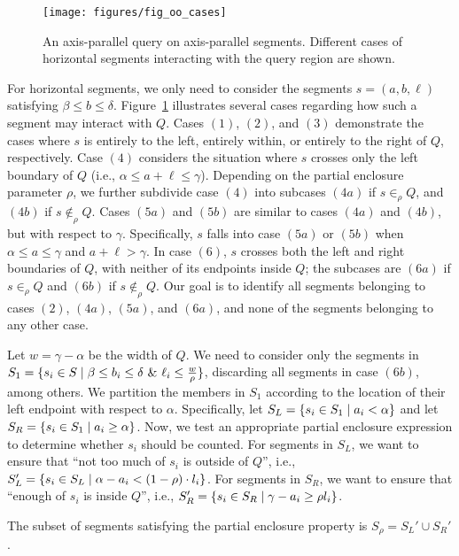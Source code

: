 \begin{figure}[t]
\centering
\texttt{[image: figures/fig\_oo\_cases]}
\caption{An axis-parallel query on axis-parallel segments. Different cases 
of horizontal segments interacting with the query region are shown.}
\label{:fig:rectangles:ap:cases}
\end{figure}

For horizontal segments, we only need to consider the segments  
$s=(a, b, \ell)$
satisfying $\beta \leq b \leq \delta$. 
Figure~\ref{:fig:rectangles:ap:cases} illustrates several cases 
regarding how such a segment may interact with $Q$. 
Cases $(1)$, $(2)$, and $(3)$ demonstrate the cases where $s$ is 
entirely to the left, entirely within, or entirely to the right of $Q$, 
respectively. Case $(4)$ considers the situation where $s$ crosses 
only the left boundary of $Q$ (i.e., $\alpha \leq a+\ell \leq \gamma$). 
Depending on the partial enclosure parameter $\rho$, we further 
subdivide case $(4)$ into subcases $(4a)$ if $s \in_\rho Q$, and 
$(4b)$ if $s \not \in_\rho Q$. Cases $(5a)$ and $(5b)$ are similar 
to cases $(4a)$ and $(4b)$, but with respect to $\gamma$. Specifically, 
$s$ falls into case $(5a)$ or $(5b)$ when $\alpha \leq a \leq \gamma$ 
and $a+\ell > \gamma$. In case $(6)$, $s$ crosses both the left and right 
boundaries of $Q$, with neither of its endpoints inside $Q$;
the subcases are $(6a)$ if $s \in_\rho Q$ and $(6b)$ if $s \not 
\in_\rho Q$.
Our goal is to identify all segments belonging to cases $(2)$, $(4a)$, $(5a)$, 
and $(6a)$, and none of the segments belonging to any other case.

Let $w = \gamma - \alpha$ be the width of $Q$. We need to consider 
only the segments in $S_1 = \{s_i \in S \;|\; \beta \leq b_i \leq \delta 
~\&~ \ell_i \leq \frac{w}{\rho}\}$, discarding all segments in case $(6b)$, 
among others.
We partition the members in $S_1$ 
according to the location of their left endpoint with respect to $\alpha$. 
Specifically, let $S_L = \{s_i \in S_1 \;|\; a_i < \alpha\}$ and let 
$S_R = \{s_i \in S_1 \;|\; a_i \geq \alpha\}$.
Now, we test an appropriate partial enclosure expression to determine 
whether $s_i$ should be counted. For segments in $S_L$, we want to 
ensure that ``not too much of $s_i$ is outside of $Q$'', i.e., $S_L' 
= \{ s_i \in S_L \;|\; \alpha - a_i < (1 - \rho) \cdot l_i\}$.
For segments in $S_R$, we want to ensure that ``enough of $s_i$ is inside 
$Q$'', i.e., $S_R' = \{s_i \in S_R \;|\; \gamma - a_i \geq  \rho l_i\}$.

\begin{observation}
The subset of segments satisfying the partial enclosure property is 
$S_\rho = S_L' \cup S_R'$. 
\end{observation}


